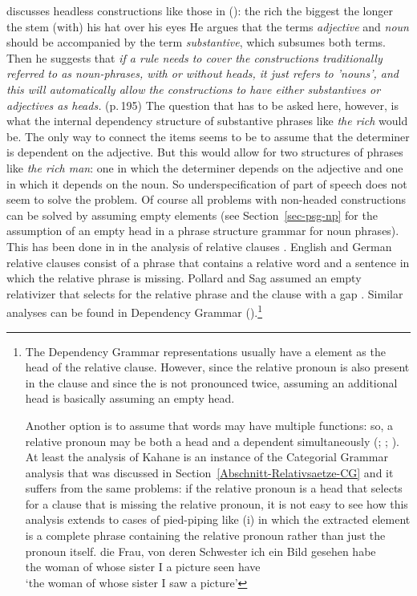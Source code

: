 \citet[Section~4.E]{Hudson80a} discusses headless constructions like those in ():
\eal
\ex the rich
\ex the biggest
\ex the longer the stem
\ex (with) his hat over his eyes
\zl
He argues that the terms \emph{adjective} and \emph{noun} should be accompanied by the term
\emph{substantive}, which subsumes both terms. Then he suggests that \emph{if a rule needs to cover
  the constructions traditionally referred to as noun-phrases, with or without heads, it just
  refers to 'nouns', and this will automatically allow the constructions to have either
substantives or adjectives as heads.} (p.\,195) The question that has to be asked here, however, is
what the internal dependency structure of substantive phrases like \emph{the rich} would be. The
only way to connect the items seems to be to assume that the determiner is dependent on the
adjective. But this would allow for two structures of phrases like \emph{the rich man}: one in which
the determiner depends on the adjective and one in which it depends on the noun. So
underspecification of part of speech does not seem to solve the problem. Of course all problems with
non-headed constructions can be solved by assuming empty elements (see Section~\ref{sec-psg-np} for the
assumption of an empty head in a phrase structure grammar for noun phrases). This has been done in \hpsg in
the analysis of relative clauses \citep[Chapter~5]{ps2}. English and German relative clauses consist of a
phrase that contains a relative word and a sentence in which the relative phrase is missing. Pollard
and Sag assumed an empty relativizer that selects for the relative phrase and the clause with a
gap \citep[--217]{ps2}. Similar analyses can be found in Dependency Grammar (\citealp[]{Eroms2000a}).\footnote{
  The Dependency Grammar representations usually have a  element as the head of the relative
  clause. However, since the relative pronoun is also present in the clause and since the 
  is not pronounced twice, assuming an additional  head is basically assuming an empty
  head. 

  Another option is to assume that words may have multiple functions: so, a relative pronoun may be
  both a head and a dependent simultaneously (\citealp[Chapter 246, §8--11]{Tesniere2015a-u}; \citealp[\page xlvi]{OK2015a}; \citealp[--130]{Kahane2009a}). At least the analysis of Kahane is an instance of the Categorial
  Grammar analysis that was discussed in Section~\ref{Abschnitt-Relativsaetze-CG} and it suffers from the same problems: if the
  relative pronoun is a head that selects for a clause that is missing the relative pronoun, it is not easy to see how
  this analysis extends to cases of pied-piping like (i) in which the extracted element is a complete phrase
  containing the relative pronoun rather than just the pronoun itself.
\ea
\gll die Frau, von deren Schwester ich ein Bild gesehen habe\\
     the woman of whose sister I a picture seen have\\
\glt `the woman of whose sister I saw a picture'
\zlast
}
